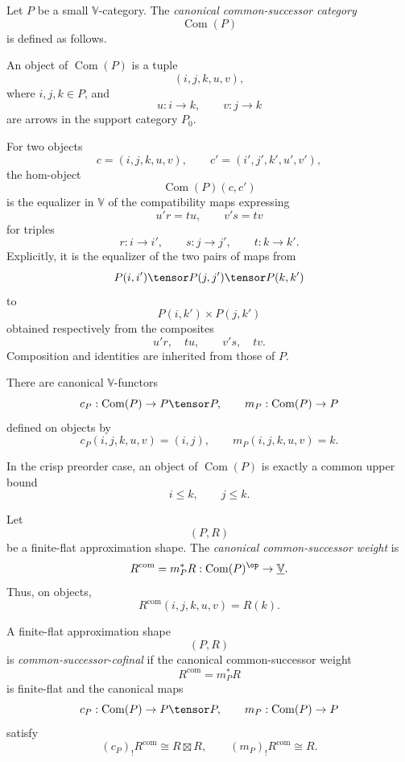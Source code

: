 \begin{definition}
\label{def:canonical-common-successor-category}
Let \(P\) be a small \(\mathbb V\)-category.  The
\emph{canonical common-successor category}
\[
    \operatorname{Com}(P)
\]
is defined as follows.

An object of \(\operatorname{Com}(P)\) is a tuple
\[
    (i,j,k,u,v),
\]
where \(i,j,k\in P\), and
\[
    u:i\to k,
    \qquad
    v:j\to k
\]
are arrows in the support category \(P_0\).

For two objects
\[
    c=(i,j,k,u,v),
    \qquad
    c'=(i',j',k',u',v'),
\]
the hom-object
\[
    \operatorname{Com}(P)(c,c')
\]
is the equalizer in \(\mathbb V\) of the compatibility maps expressing
\[
    u'r=tu,
    \qquad
    v's=tv
\]
for triples
\[
    r:i\to i',
    \qquad
    s:j\to j',
    \qquad
    t:k\to k'.
\]
Explicitly, it is the equalizer of the two pairs of maps from
\[
    P(i,i')\tensor P(j,j')\tensor P(k,k')
\]
to
\[
    P(i,k')\times P(j,k')
\]
obtained respectively from the composites
\[
    u'r,\quad tu,
    \qquad
    v's,\quad tv.
\]
Composition and identities are inherited from those of \(P\).

There are canonical \(\mathbb V\)-functors
\[
    c_P:\operatorname{Com}(P)\to P\tensor P,
    \qquad
    m_P:\operatorname{Com}(P)\to P
\]
defined on objects by
\[
    c_P(i,j,k,u,v)=(i,j),
    \qquad
    m_P(i,j,k,u,v)=k.
\]
\end{definition}

In the crisp preorder case, an object of \(\operatorname{Com}(P)\) is exactly
a common upper bound
\[
    i\leq k,
    \qquad
    j\leq k.
\]

\begin{definition}
\label{def:canonical-common-successor-weight}
Let
\[
    (P,R)
\]
be a finite-flat approximation shape.  The
\emph{canonical common-successor weight} is
\[
    R^{\mathrm{com}}
    =
    m_P^{*}R:
    \operatorname{Com}(P)^{\op}
    \to
    \underline{\mathbb V}.
\]
Thus, on objects,
\[
    R^{\mathrm{com}}(i,j,k,u,v)=R(k).
\]
\end{definition}

\begin{definition}
\label{def:common-successor-cofinal-shape}
A finite-flat approximation shape
\[
    (P,R)
\]
is \emph{common-successor-cofinal} if the canonical common-successor weight
\[
    R^{\mathrm{com}}=m_P^*R
\]
is finite-flat and the canonical maps
\[
    c_P:\operatorname{Com}(P)\to P\tensor P,
    \qquad
    m_P:\operatorname{Com}(P)\to P
\]
satisfy
\[
    (c_P)_!R^{\mathrm{com}}\cong R\boxtimes R,
    \qquad
    (m_P)_!R^{\mathrm{com}}\cong R.
\]
\end{definition}

